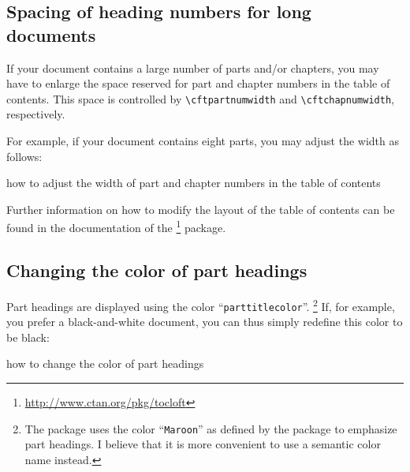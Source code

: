 
\subsection{Spacing of heading numbers for long documents}

If your document contains a large number of parts and/or chapters, you may have to enlarge the space reserved for part and chapter numbers in the table of contents. This space is controlled by \lstinline|\cftpartnumwidth| and \lstinline|\cftchapnumwidth|, respectively.

For example, if your document contains eight parts, you may adjust the width as follows:

\begin{texcode}{how to adjust the width of part and chapter numbers in the table of contents}
\settowidth{\cftpartnumwidth}{\cftpartpagefont VIII}
\setlength{\cftchapnumwidth}{\cftpartnumwidth}
\end{texcode}

Further information on how to modify the layout of the table of contents can be found in the documentation of the \footnote{\url{http://www.ctan.org/pkg/tocloft}} package.

\subsection{Changing the color of part headings}

Part headings are displayed using the color \enquote{\texttt{parttitlecolor}}.%
\footnote{The  package uses the color \enquote{\texttt{Maroon}} as defined by the  package to emphasize part headings. I believe that it is more convenient to use a semantic color name instead.} %
If, for example, you prefer a black-and-white document, you can thus simply redefine this color to be black:
\begin{texcode}{how to change the color of part headings}
\end{texcode}


